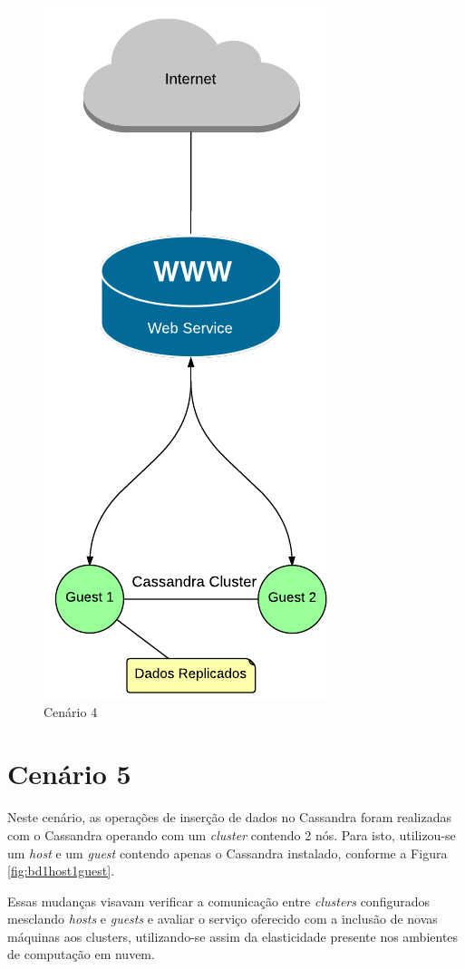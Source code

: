     \begin{figure}[H]
    \centering
    \includegraphics[scale=0.60]{imagens/BD-2Guest.pdf}
    \caption{Cenário 4}
    \label{fig:bd2guest}
    \end{figure} 


\section{Cenário 5}
Neste cenário, as operações de inserção de dados no Cassandra foram realizadas com o Cassandra operando com um \textit{cluster} contendo 2 nós.
Para isto, utilizou-se um \textit{host} e um \textit{guest} contendo apenas o Cassandra instalado, conforme a Figura \ref{fig:bd1host1guest}.

Essas mudanças visavam verificar a comunicação entre \textit{clusters} configurados mesclando \textit{hosts} e \textit{guests} e avaliar o serviço oferecido com a inclusão de novas máquinas aos clusters, utilizando-se assim da elasticidade presente nos ambientes de computação em nuvem.

